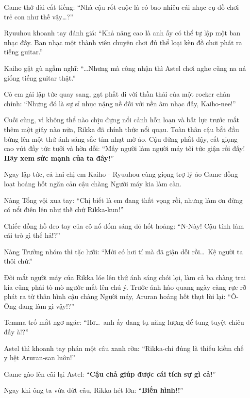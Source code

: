 \documentclass[../main.tex]{subfiles}
\begin{document}

Game thở dài cất tiếng: ``Nhà cậu rốt cuộc là có bao nhiêu cái nhạc cụ đồ chơi trẻ con như thế vậy\dots?''

Ryuuhou khoanh tay đánh giá: ``Khả năng cao là anh ấy có thể tự lập một ban nhạc đấy. Ban nhạc một thành viên chuyên chơi đủ thể loại kèn đồ chơi phát ra tiếng guitar.''

Kaiho gật gù ngẫm nghĩ: ``\dots Nhưng mà công nhận thì Astel chơi nghe cũng na ná giống tiếng guitar thật.''

Cô em gái lập tức quay sang, gạt phắt đi với thần thái của một rocker chân chính: ``Nhưng đó là sự sỉ nhục nặng nề đối với nền âm nhạc đấy, Kaiho-nee!''

Cuối cùng, vì không thể nào chịu đựng nổi cảnh hỗn loạn và bất lực trước mắt thêm một giây nào nữa, Rikka đã chính thức nổi quạu. Toàn thân cậu bắt đầu bừng lên một thứ ánh sáng sắc tím nhạt mờ ảo. Cậu đứng phắt dậy, cất giọng cao vút đầy tức tưởi và hờn dỗi: ``Mấy người làm người máy tôi tức giận rồi đấy! \textbf{Hãy xem sức mạnh của ta đây!}''


Ngay lập tức, cả hai chị em Kaiho - Ryuuhou cùng giọng trợ lý ảo Game đồng loạt hoảng hốt ngăn cản cậu chàng Người máy kia làm càn.

Nàng Tổng vội xua tay: ``Chị biết là em đang thất vọng rồi, nhưng làm ơn đừng có nổi điên lên như thế chứ Rikka-kun!''

Chiếc đồng hồ đeo tay của cô nổ đốm sáng đỏ hốt hoảng: ``N-Này! Cậu tính làm cái trò gì thế hả!?''

Nàng Trưởng nhóm thì tặc lưỡi: ``Mới có hơi tí mà đã giận dỗi rồi\dots\ Kệ người ta thôi chứ.''

Đôi mắt người máy của Rikka lóe lên thứ ánh sáng chói lọi, làm cả ba chàng trai kia cũng phải tò mò ngước mắt lên chú ý. Trước ánh hào quang ngày càng rực rỡ phát ra từ thân hình cậu chàng Người máy, Aruran hoảng hốt thụt lùi lại: ``Ô-Ông đang làm gì vậy!?''

Temma trố mắt ngơ ngác: ``Hơ\dots\ anh ấy đang tụ năng lượng để tung tuyệt chiêu đấy à!?''

Astel thì khoanh tay phán một câu xanh rờn: ``Rikka-chi đúng là thiếu kiềm chế y hệt Aruran-san luôn!''

Game gào lên cãi lại Astel: ``\textbf{Cậu chả giúp được cái tích sự gì cả!}''

Ngay khi ông ta vừa dứt câu, Rikka hét lớn: ``\textbf{Biến hình!!}''
\end{document}
